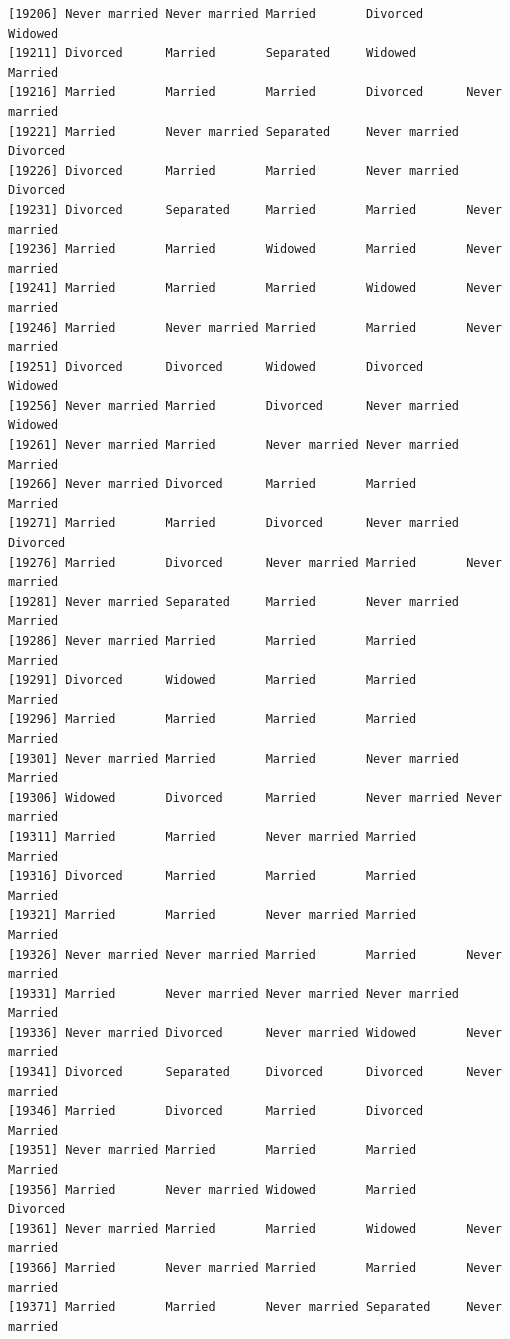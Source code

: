 \documentclass[
  letterpaper,
  DIV=11,
  numbers=noendperiod,
  oneside]{scrartcl}
\begin{document}
\begin{verbatim}
[19206] Never married Never married Married       Divorced      Widowed      
[19211] Divorced      Married       Separated     Widowed       Married      
[19216] Married       Married       Married       Divorced      Never married
[19221] Married       Never married Separated     Never married Divorced     
[19226] Divorced      Married       Married       Never married Divorced     
[19231] Divorced      Separated     Married       Married       Never married
[19236] Married       Married       Widowed       Married       Never married
[19241] Married       Married       Married       Widowed       Never married
[19246] Married       Never married Married       Married       Never married
[19251] Divorced      Divorced      Widowed       Divorced      Widowed      
[19256] Never married Married       Divorced      Never married Widowed      
[19261] Never married Married       Never married Never married Married      
[19266] Never married Divorced      Married       Married       Married      
[19271] Married       Married       Divorced      Never married Divorced     
[19276] Married       Divorced      Never married Married       Never married
[19281] Never married Separated     Married       Never married Married      
[19286] Never married Married       Married       Married       Married      
[19291] Divorced      Widowed       Married       Married       Married      
[19296] Married       Married       Married       Married       Married      
[19301] Never married Married       Married       Never married Married      
[19306] Widowed       Divorced      Married       Never married Never married
[19311] Married       Married       Never married Married       Married      
[19316] Divorced      Married       Married       Married       Married      
[19321] Married       Married       Never married Married       Married      
[19326] Never married Never married Married       Married       Never married
[19331] Married       Never married Never married Never married Married      
[19336] Never married Divorced      Never married Widowed       Never married
[19341] Divorced      Separated     Divorced      Divorced      Never married
[19346] Married       Divorced      Married       Divorced      Married      
[19351] Never married Married       Married       Married       Married      
[19356] Married       Never married Widowed       Married       Divorced     
[19361] Never married Married       Married       Widowed       Never married
[19366] Married       Never married Married       Married       Never married
[19371] Married       Married       Never married Separated     Never married

\end{verbatim}
\end{document}
